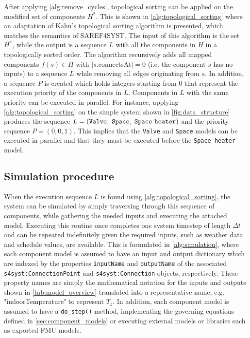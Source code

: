 After applying \autoref{alg:remove_cycles}, topological sorting can be applied on the modified set of components $H^*$. This is shown in \autoref{alg:topological_sorting} where an adaptation of Kahn's topological sorting algorithm is presented, which matches the semantics of SAREF4SYST. The input of this algorithm is the set $H^*$, while the output is a sequence $L$ with all the components in $H$ in a topologically sorted order. The algorithm recursively adds all mapped components $f(s) \in H$ with $|s$.connectsAt$| = 0$ (i.e. the component $s$ has no inputs) to a sequence $L$ while removing all edges originating from $s$. In addition, a sequence $P$ is created which holds integers starting from 0 that represent the execution priority of the components in $L$. Components in $L$ with the same priority can be executed in parallel. For instance, applying \autoref{alg:topological_sorting} on the simple system shown in \autoref{fig:data_structure} produces the sequence $L=(\texttt{Valve}, \;\texttt{Space}, \;\texttt{Space \!heater})$ and the priority sequence $P=(0,0,1)$. This implies that the \texttt{Valve} and \texttt{Space} models can be executed in parallel and that they must be executed before the \texttt{Space \!heater} model. 

\subsection{Simulation procedure}

When the execution sequence $L$ is found using \autoref{alg:topological_sorting}, the system can be simulated by simply traversing through this sequence of components, while gathering the needed inputs and executing the attached model. Executing this routine once completes one system timestep of length $\Delta t$ and can be repeated indefinitely given the required inputs, such as weather data and schedule values, are available. This is formulated in \autoref{alg:simulation}, where each component model is assumed to have an input and output dictionary which are indexed by the properties \texttt{inputName} and \texttt{outputName} of the associated \texttt{s4syst:ConnectionPoint} and \texttt{s4syst:Connection} objects, respectively. These property names are simply the mathematical notation for the inputs and outputs shown in \autoref{tab:model_overview} translated into a representative name, e.g. "indoorTemperature" to represent $T_z$. In addition, each component model is assumed to have a \texttt{do\_step()} method, implementing the governing equations defined in \autoref{sec:component_models} or executing external models or libraries such as exported FMU models. 

